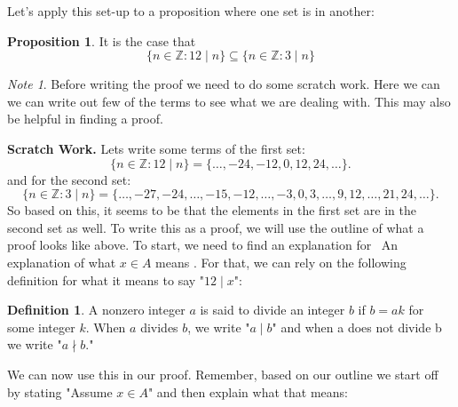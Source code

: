 \documentclass{amsart} %
\theoremstyle{definition} %
\newtheorem*{dfn}{Definition} %
\theoremstyle{definition}
\newtheorem*{prpn}{Proposition}
\theoremstyle{remark} %
\newtheorem*{note}{Note}
\begin{document}
\smallskip
Let's apply this set-up to a proposition where one set is in another:

\begin{prpn}
It is the case that \[ \{n \in \mathbb{Z} : 12 \mid n \} \subseteq \{n \in \mathbb{Z}: 3 \mid n \} \]
\end{prpn}

\medskip
\begin{note}
Before writing the proof we need to do some scratch work. Here we can we can write out few of the terms to see what we are dealing with. This may also be helpful in finding a proof.
\end{note}

\noindent \textbf{Scratch Work.} Lets write some terms of the first set: \[ \{n \in \mathbb{Z} : 12\mid n \} = \{\dots,-24, -12, 0, 12, 24, \dots \}. \] and for the second set: \[ \{n \in \mathbb{Z}:3\mid n \} = \{\dots, -27, -24, \dots, -15, -12, \dots, -3, 0, 3, \dots, 9, 12, \dots, 21, 24, \dots \}. \]
So based on this, it seems to be that the elements in the first set are in the second set as well. To write this as a proof, we will use the outline of what a proof looks like above. To start, we need to find an explanation for \guillemotleft\ An explanation of what $ x \in A$ means \guillemotright. For that, we can rely on the following definition for what it means to say "$12 \mid x$":

\begin{dfn}
 \quad A nonzero integer $a$ is said to divide an integer $b$ if $b = ak$ for some integer $k$. When $a$ divides $b$, we write "$a \mid  b$" and when a does not divide b we write "$a \nmid b$."
\end{dfn}

We can now use this in our proof. Remember, based on our outline we start off by stating "Assume $x \in A$" and then explain what that means:
\end{document}
